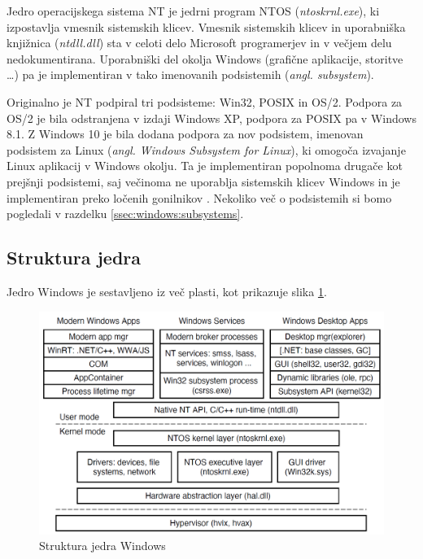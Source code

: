 \documentclass[a4paper,12pt,openright]{book}
\begin{document}
Jedro operacijskega sistema NT je jedrni program NTOS (\textit{ntoskrnl.exe}), ki izpostavlja vmesnik sistemskih klicev.
Vmesnik sistemskih klicev in uporabniška knjižnica (\textit{ntdll.dll}) sta v celoti delo Microsoft programerjev in v večjem delu nedokumentirana.
Uporabniški del okolja Windows (grafične aplikacije, storitve \dots) pa je implementiran v tako imenovanih podsistemih (\textit{angl. subsystem}).

Originalno je NT podpiral tri podsisteme: Win32, POSIX in OS/2.
Podpora za OS/2 je bila odstranjena v izdaji Windows XP, podpora za POSIX pa v Windows 8.1.
Z Windows 10 je bila dodana podpora za nov podsistem, imenovan podsistem za Linux (\textit{angl. Windows Subsystem for Linux}), ki omogoča izvajanje Linux aplikacij v Windows okolju.
Ta je implementiran popolnoma drugače kot prejšnji podsistemi, saj večinoma ne uporablja sistemskih klicev Windows in je implementiran preko ločenih gonilnikov \cite{Yosifovich_Russinovich_Solomon_Ionescu_2017}.
Nekoliko več o podsistemih si bomo pogledali v razdelku \ref{ssec:windows:subsystems}.

\subsection{Struktura jedra}

Jedro Windows je sestavljeno iz več plasti, kot prikazuje slika \ref{fig:windows_kernel_structure}.

\begin{figure}[h!]
	\begin{center}
		\includegraphics[width=\textwidth]{images/windows_programming_layers.png}
	\end{center}
	\caption{Struktura jedra Windows \cite{Tanenbaum_Bos_2023}}
	\label{fig:windows_kernel_structure}
\end{figure}
\end{document}
